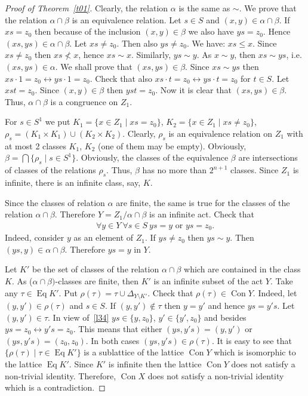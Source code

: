 \documentclass{birkau}
\numberwithin{equation}{section}
\theoremstyle{plain}
\theoremstyle{definition}
\DeclareMathOperator{\Con}{Con}
\DeclareMathOperator{\Eq}{Eq}
\begin{document}
\begin{proof}[Proof of Theorem~\ref{t01}]
		Clearly, the relation $\alpha$ is the same as $\sim$. We prove that the relation $\alpha \cap \beta$ is an equivalence relation. Let $s \in S$ and $(x,y) \in \alpha \cap \beta$. If $xs = z_0$ then because of the inclusion $(x,y) \in \beta$ we also have $ys = z_0$. Hence $(xs,ys) \in \alpha \cap \beta$. Let $xs \neq z_0$. Then also $ ys \neq z_0 $. We have: $xs \leqslant x$. Since $xs \neq z_0$ then $xs \not < x$, hence $xs \sim x$. Similarly, $ys \sim y$. As $x \sim y$, then $ xs \sim ys$, i.e. $(xs,ys) \in \alpha$. We shall prove that $(xs,ys) \in \beta$. Since $xs \sim ys$ then $xs \cdot 1 = z_0 \leftrightarrow ys \cdot 1 = z_0$. Check that also $xs \cdot t = z_0 \leftrightarrow ys \cdot t = z_0$ for $t \in S$. Let $xst = z_0$. Since $(x,y) \in \beta$ then $yst = z_0$. Now it is clear that $(xs,ys) \in \beta$. Thus, $\alpha \cap \beta$ is a congruence on $Z_1$.
		
		For $s \in S^1$ we put $ K_1 = \{ x \in Z_1 \mid xs = z_0 \} $, $ K_2 = \{ x \in Z_1 \mid xs \neq z_0 \}$, $\rho_s = (K_1 \times K_1) \cup (K_2 \times K_2)$. Clearly, $\rho_s$ is an equivalence relation on $Z_1$ with at most 2 classes $K_1$, $K_2$ (one of them may be empty). Obviously, $\beta = \bigcap \{\rho_s \mid s \in S^1\}$. Obviously, the classes of the equivalence $\beta$ are intersections of classes of the relations $\rho_s$. Thus, $\beta$ has no more than $2^{n+1}$ classes. Since $Z_1$ is infinite, there is an infinite class, say, $K$.
		
		Since the classes of relation $\alpha$ are finite, the same is true for the classes of the relation $\alpha \cap \beta$. Therefore $Y = {Z_1}/{\alpha \cap \beta}$ is an infinite act. Check that
		\begin{gather}
		    \forall y \in Y \ \forall s \in S \ ys = y \text{ or } ys = z_0. \label{l34}
		\end{gather}
		Indeed, consider $y$ as an element of $Z_1$. If $ys \neq z_0$ then $ys \sim y$. Then $(ys,y) \in \alpha \cap \beta$. Therefore $ys = y$ in $Y$.
		
		Let $K'$ be the set of classes of the relation $\alpha \cap \beta$ which are contained in the class $K$. As ($\alpha \cap \beta)$-classes are finite, then $K'$ is an infinite subset of the act $Y$. Take any $\tau \in \Eq K'$. Put $\rho(\tau) = \tau \cup \Delta_{Y \setminus K'}$. Check that $\rho(\tau) \in \Con Y$. Indeed, let $(y,y') \in \rho(\tau)$ and $s \in S$. If $(y,y') \notin \tau$ then $y = y'$ and hence $ys = y's$. Let $(y,y') \in \tau$. In view of~\eqref{l34} $ys \in \{y,z_0\}$, $y' \in \{ y',z_0 \}$ and besides $ys = z_0 \leftrightarrow y's = z_0$. This means that either $(ys,y's) = (y,y')$ or $(ys,y's) = (z_0,z_0)$. In both cases $(ys,y's) \in \rho(\tau)$. It is easy to see that $\{\rho(\tau) \mid \tau \in \Eq K' \} $ is a sublattice of the lattice $\Con Y$ which is isomorphic to the lattice $\Eq K'$. Since $K'$ is infinite then the lattice $\Con Y$ does not satisfy a non-trivial identity. Therefore, $\Con X$ does not satisfy a non-trivial identity which is a contradiction.
		

\end{proof}
\end{document}

